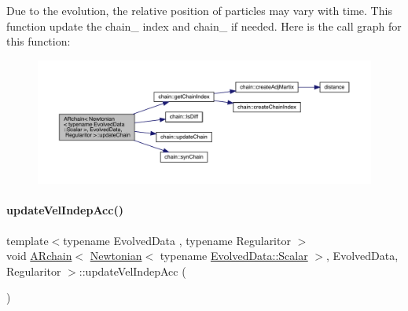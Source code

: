 Due to the evolution, the relative position of particles may vary with time. This function update the chain_ index and chain_ if needed. Here is the call graph for this function\+:\nopagebreak
\begin{figure}[H]
\begin{center}
\leavevmode
\includegraphics[width=350pt]{class_a_rchain_3_01_newtonian_3_01typename_01_evolved_data_1_1_scalar_01_4_00_01_evolved_data_00_01_regularitor_01_4_acbe31e9aa918e4f80a2763e16f0bb7bc_cgraph}
\end{center}
\end{figure}
\mbox{\label{class_a_rchain_3_01_newtonian_3_01typename_01_evolved_data_1_1_scalar_01_4_00_01_evolved_data_00_01_regularitor_01_4_a2b11ca856564416ed6727c716ed284a8}} 
\paragraph{\texorpdfstring{update\+Vel\+Indep\+Acc()}{updateVelIndepAcc()}}
{\footnotesize\ttfamily template$<$typename Evolved\+Data , typename Regularitor $>$ \\
void \mbox{\hyperlink{class_a_rchain}{A\+Rchain}}$<$ \mbox{\hyperlink{class_newtonian}{Newtonian}}$<$ typename \mbox{\hyperlink{class_a_rchain_a707e42a79e4744424a34c9007e84ee07}{Evolved\+Data\+::\+Scalar}} $>$, Evolved\+Data, Regularitor $>$\+::update\+Vel\+Indep\+Acc (\begin{DoxyParamCaption}{ }\end{DoxyParamCaption})\hspace{0.3cm}{\ttfamily [private]}}



